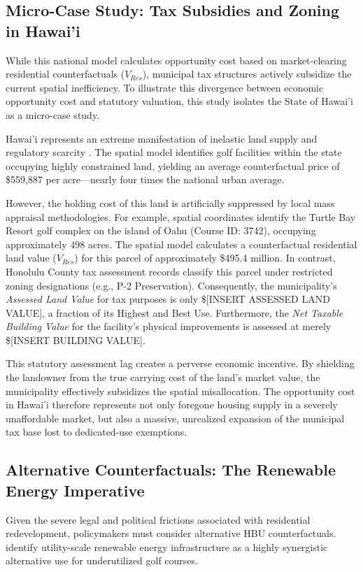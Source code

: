 \documentclass[10pt, letterpaper]{article}
\begin{document}
\subsection{Micro-Case Study: Tax Subsidies and Zoning in Hawai'i}
While this national model calculates opportunity cost based on market-clearing residential counterfactuals ($V_{Res}$), municipal tax structures actively subsidize the current spatial inefficiency. To illustrate this divergence between economic opportunity cost and statutory valuation, this study isolates the State of Hawai'i as a micro-case study. 

Hawai'i represents an extreme manifestation of inelastic land supply and regulatory scarcity \parencite{Glaeser2005}. The spatial model identifies golf facilities within the state occupying highly constrained land, yielding an average counterfactual price of \$559,887 per acre—nearly four times the national urban average. 

However, the holding cost of this land is artificially suppressed by local mass appraisal methodologies. For example, spatial coordinates identify the Turtle Bay Resort golf complex on the island of Oahu (Course ID: 3742), occupying approximately 498 acres. The spatial model calculates a counterfactual residential land value ($V_{Res}$) for this parcel of approximately \$495.4 million. In contrast, Honolulu County tax assessment records classify this parcel under restricted zoning designations (e.g., P-2 Preservation). Consequently, the municipality's \textit{Assessed Land Value} for tax purposes is only \$[INSERT ASSESSED LAND VALUE], a fraction of its Highest and Best Use. Furthermore, the \textit{Net Taxable Building Value} for the facility's physical improvements is assessed at merely \$[INSERT BUILDING VALUE].

This statutory assessment lag creates a perverse economic incentive. By shielding the landowner from the true carrying cost of the land's market value, the municipality effectively subsidizes the spatial misallocation. The opportunity cost in Hawai'i therefore represents not only foregone housing supply in a severely unaffordable market, but also a massive, unrealized expansion of the municipal tax base lost to dedicated-use exemptions.

\subsection{Alternative Counterfactuals: The Renewable Energy Imperative}
Given the severe legal and political frictions associated with residential redevelopment, policymakers must consider alternative HBU counterfactuals. \textcite{Weinand2025} identify utility-scale renewable energy infrastructure as a highly synergistic alternative use for underutilized golf courses. 
\end{document}
